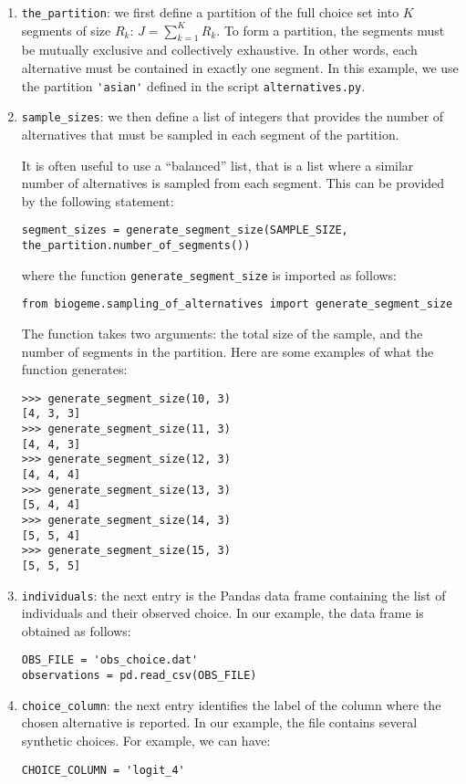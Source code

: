 \documentclass[12pt,a4paper]{article}
\begin{document}
\begin{enumerate}
  \item \lstinline+the_partition+: we first define a partition of the full choice set into $K$ segments
of size $R_k$: $J=\sum_{k=1}^K R_k$. To form a partition, the segments 
must be mutually exclusive and collectively exhaustive. In other
words, each alternative must be contained in exactly one segment.
In this example, we use the partition \lstinline+'asian'+ defined in the script \lstinline+alternatives.py+. 

  \item \lstinline+sample_sizes+: we then define a list of integers that provides the number of
alternatives that must be sampled in each segment of the partition.

It is often useful to use a ``balanced'' list, that is a list where a similar number of alternatives is sampled from each segment. This can be provided by the following statement:
\begin{lstlisting}
segment_sizes = generate_segment_size(SAMPLE_SIZE, the_partition.number_of_segments())
\end{lstlisting}
where the function \lstinline+generate_segment_size+ is imported as follows:
\begin{lstlisting}
from biogeme.sampling_of_alternatives import generate_segment_size
\end{lstlisting}
The function takes two arguments: the total size of the sample, and the number of segments in the partition. Here are some examples of what the function generates:
\begin{lstlisting}
>>> generate_segment_size(10, 3)
[4, 3, 3]
>>> generate_segment_size(11, 3)
[4, 4, 3]
>>> generate_segment_size(12, 3)
[4, 4, 4]
>>> generate_segment_size(13, 3)
[5, 4, 4]
>>> generate_segment_size(14, 3)
[5, 5, 4]
>>> generate_segment_size(15, 3)
[5, 5, 5]
\end{lstlisting}

\item \lstinline+individuals+: the next entry is the Pandas data frame
  containing the list of individuals and their observed choice. In our
  example, the data frame is obtained as follows:
  \begin{lstlisting}
OBS_FILE = 'obs_choice.dat'
observations = pd.read_csv(OBS_FILE)
  \end{lstlisting}
\item \lstinline+choice_column+: the next entry identifies the label of the column where the chosen alternative is reported. In our example, the file contains several synthetic choices. For example, we can have:
  \begin{lstlisting}
CHOICE_COLUMN = 'logit_4'
  \end{lstlisting}


\end{enumerate}
\end{document}
